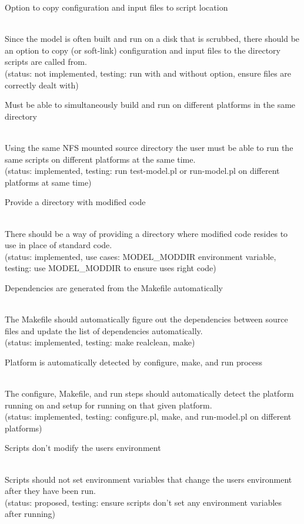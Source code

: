 \documentclass[]{article}
\begin{document}
\begin{enumerate}
{\bf\em \item Option to copy configuration and input files to script location}\\
Since the model is often built and run on a disk that is scrubbed, there should be an option
to copy (or soft-link) configuration and input files to the directory scripts are called from.\\
(status: not implemented, testing: run with and without option, ensure files are correctly
dealt with)

{\bf\em \item Must be able to simultaneously build and run on different platforms in the same directory}\\
Using the same NFS mounted source directory the user must be able to run the same scripts on 
different platforms at the same time.
\\
(status: implemented, testing: run test-model.pl or run-model.pl on different platforms at same time) 

{\bf\em \item Provide a directory with modified code}\\
There should be a way of providing a directory where modified code resides to use
in place of standard code.\\
(status: implemented, use cases: MODEL\_MODDIR environment variable, testing: use MODEL\_MODDIR
to ensure uses right code)

{\bf\em \item Dependencies are generated from the Makefile automatically}\\
The Makefile should automatically figure out the dependencies between source files
and update the list of dependencies automatically.
\\
(status: implemented, testing: make realclean, make)

{\bf\em \item Platform is automatically detected by configure, make, and run process}\\
The configure, Makefile, and run steps should automatically detect the platform running
on and setup for running on that given platform.
\\
(status: implemented, testing: configure.pl, make, and run-model.pl on different platforms)

{\bf\em \item Scripts don't modify the users environment}\\
Scripts should not set environment variables that change the users environment after they
have been run.
\\
(status: proposed, testing: ensure scripts don't set any environment variables after running)


\end{enumerate}
\end{document}
